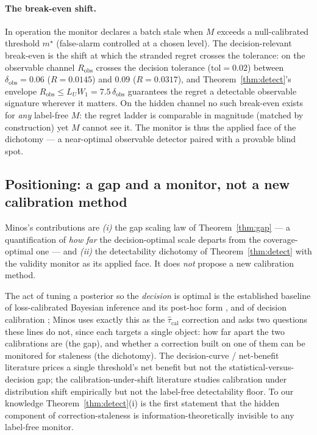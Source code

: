 \paragraph{The break-even shift.}
In operation the monitor declares a batch stale when $M$ exceeds a null-calibrated threshold $m^\star$
(false-alarm controlled at a chosen level). The decision-relevant break-even is the shift at which the
stranded regret crosses the tolerance: on the observable channel $R_{\mathrm{obs}}$ crosses the
decision tolerance ($\text{tol}=0.02$) between $\delta_{\mathrm{obs}}=0.06$ ($R=0.0145$) and $0.09$
($R=0.0317$),
and Theorem~\ref{thm:detect}'s envelope $R_{\mathrm{obs}}\le L_U W_1=7.5\,\delta_{\mathrm{obs}}$
guarantees the regret a detectable observable signature wherever it matters. On the hidden channel no
such break-even exists for \emph{any} label-free $M$: the regret ladder is comparable in magnitude
(matched by construction) yet $M$ cannot see it. The monitor is thus the applied face of the
dichotomy --- a near-optimal observable detector paired with a provable blind spot.

\subsection{Positioning: a gap and a monitor, not a new calibration method}
\label{sec:positioning}

Minos's contributions are \emph{(i)} the gap scaling law of Theorem~\ref{thm:gap} --- a quantification
of \emph{how far} the decision-optimal scale departs from the coverage-optimal one --- and \emph{(ii)}
the detectability dichotomy of Theorem~\ref{thm:detect} with the validity monitor as
its applied face. It does \emph{not} propose a new calibration method.

The act of tuning a posterior so the \emph{decision} is optimal is the established baseline of
loss-calibrated Bayesian inference \citep{lacostejulien2011} and its post-hoc form
\citep{vadera2021}, and of decision calibration \citep{zhao2021}; Minos uses exactly this as the
$\hat\tau_{\mathrm{cal}}$ correction and asks two questions these lines do not, since each targets a
single object: how far apart the two calibrations are (the gap), and whether a correction built on one
of them can be monitored for staleness (the dichotomy). The decision-curve / net-benefit literature
\citep{vickers2006} prices a single threshold's net benefit but not the statistical-versus-decision
gap; the calibration-under-shift literature \citep{ovadia2019} studies calibration under distribution
shift empirically but not the label-free detectability floor. To our knowledge Theorem~\ref{thm:detect}(i)
is the first statement that the hidden component of correction-staleness is information-theoretically
invisible to any label-free monitor.

